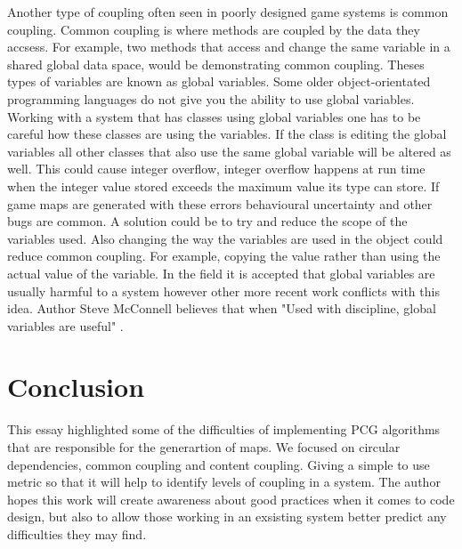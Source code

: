 \documentclass{scrartcl}
\begin{document}
Another type of coupling often seen in poorly designed game systems is common coupling. Common coupling is where methods are coupled by the data they accsess\cite{briand1999unified}. For example, two methods that access and change the same variable in a shared global data space, would be demonstrating common coupling. Theses types of variables are known as global variables. Some older object-orientated programming languages do not give you the ability to use global variables. Working with a system that has classes using global variables one has to be careful how these classes are using the variables. If the class is editing the global variables all other classes that also use the same global variable will be altered as well. This could cause integer overflow, integer overflow happens at run time when the integer value stored exceeds the maximum value its type can store\cite{muntean2015smt}. If game maps are generated with these errors behavioural uncertainty and other bugs are common. A solution could be to try and reduce the scope of the variables used. Also changing the way the variables are used in the object could reduce common coupling. For example, copying the value rather than using the actual value of the variable. In the field it is accepted that global variables are usually harmful to a system\cite {wulf1973global} however other more recent work conflicts with this idea. Author Steve McConnell believes that when "Used with discipline, global variables are useful"\cite [p.338]{mcconnell2004code} .

\section{Conclusion}
This essay highlighted some of the difficulties of implementing PCG algorithms that are responsible for the generartion of maps. We focused on circular dependencies, common coupling and content coupling. Giving a simple to use metric so that it will help to identify levels of coupling in a system. The author hopes this work will create awareness about good practices when it comes to code design, but also to allow those working in an exsisting system better predict any difficulties they may find.  



\end{document}
